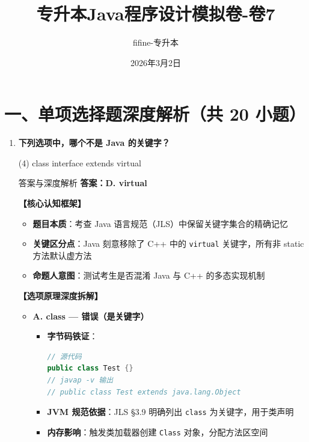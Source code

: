 ﻿\documentclass[12pt, a4paper]{ctexart}
\newcommand{\code}[1]{\texttt{#1}}
\begin{document}
\title{\textcolor{myblue}{\textbf{专升本Java程序设计模拟卷-卷7}}}
\author{fifine-专升本}
\date{2026年3月2日}
\maketitle
\thispagestyle{empty}
\newpage

\section*{一、单项选择题深度解析（共 20 小题）}

\begin{enumerate}[label=\textbf{\arabic*.}, itemsep=1em]
	\item \textbf{下列选项中，哪个不是 Java 的关键字？}
	      \begin{tasks}(4)
		      \task class \task interface \task extends \task virtual
	      \end{tasks}

	      \begin{bluebox}{答案与深度解析}
		      \textbf{答案：D. virtual}

		      \textbf{【核心认知框架】}
		      \begin{itemize}[leftmargin=*, nosep]
			      \item \textbf{题目本质}：考查 Java 语言规范（JLS）中保留关键字集合的精确记忆
			      \item \textbf{关键区分点}：Java 刻意移除了 C++ 中的 \code{virtual} 关键字，所有非 static 方法默认虚方法
			      \item \textbf{命题人意图}：测试考生是否混淆 Java 与 C++ 的多态实现机制
		      \end{itemize}

		      \textbf{【选项原理深度拆解】}
		      \begin{itemize}[leftmargin=*, nosep]
			      \item \textbf{A. class — 错误（是关键字）}
			            \begin{itemize}[leftmargin=*, nosep]
				            \item \textbf{字节码铁证}：
				                  \begin{lstlisting}[language=Java]
// 源代码
public class Test {}
// javap -v 输出
// public class Test extends java.lang.Object
            \end{lstlisting}
				            \item \textbf{JVM 规范依据}：JLS §3.9 明确列出 \code{class} 为关键字，用于类声明
				            \item \textbf{内存影响}：触发类加载器创建 \code{Class} 对象，分配方法区空间
			            \end{itemize}


\end{itemize}
\end{bluebox}
\end{enumerate}
\end{document}
